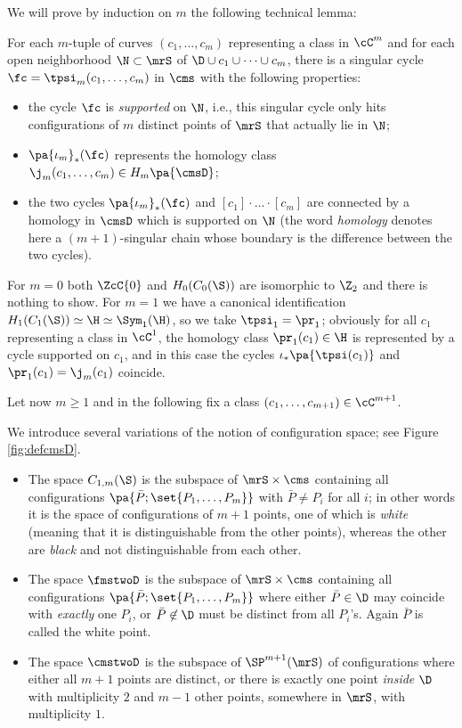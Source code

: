 We will prove by induction on $m$ the following technical lemma:

\begin{lem}
 \label{lem:tpsiwithproperties}
For each $m$-tuple of curves $(c_1,\dots,c_m)$ representing a class in $\cC^m$
and for each open neighborhood $\N\subset\mrS$ of
$\D\cup c_1\cup\dots\cup c_m$, there is a singular cycle $\fc=\tpsi_m(c_1,\dots,c_m)$
in $\cms$ with the following properties:
\begin{itemize}
 \item the cycle $\fc$ is \emph{supported} on $\N$, i.e.,
this singular cycle only hits configurations of $m$ distinct points of $\mrS$ that actually lie in $\N$;
\item $\pa{\iota_m}_*(\fc)$ represents the homology class $\j_m(c_1,\dots,c_m)\in H_m\pa{\cmsD}$;
\item the two cycles $\pa{\iota_m}_*(\fc)$ and $[c_1]\cdot\ldots\cdot[c_m]$
are connected by a homology in $\cmsD$ which is supported on $\N$ (the word
\emph{homology} denotes here a $(m+1)$-singular chain whose boundary is the difference between the two cycles).
\end{itemize}
\end{lem}

For $m=0$ both $\ZcC{0}$ and $H_0(C_0(\S))$ are
isomorphic to $\Z_2$ and there is nothing to show. For $m=1$
we have a canonical identification $H_1(C_1(\S))\simeq\H\simeq\Sym_1(\H)$, so we take $\tpsi_1=\pr_1$;
obviously for all $c_1$ representing a class in $\cC^1$, the homology class $\pr_1(c_1)\in\H$
is represented by a cycle supported on $c_1$,
and in this case the cycles $\iota_*\pa{\tpsi(c_1)}$ and $\pr_1(c_1)=\j_m(c_1)$ coincide.

Let now $m\geq 1$ and in the following fix a class $(c_1,\dots, c_{m+1})\in\cC^{m+1}$.

\begin{defn}
\label{defn:variationsCm}
We introduce several variations of the notion of configuration space; see Figure \ref{fig:defcmsD}.
\begin{itemize} 
 \item The space $C_{1,m}(\S)$ is the subspace of $\mrS\times \cms$ containing all configurations
 $\pa{\bar P;\set{P_1,\dots,P_m}}$ with $\bar P\neq P_i$ for all $i$; in other words it is
 the space of configurations of $m+1$ points, one of which is \emph{white} (meaning that
 it is distinguishable from the other points), whereas the other are \emph{black} and not distinguishable
 from each other.
 \item The space $\fmstwoD$ is the subspace of $\mrS\times\cms$ containing all configurations
 $\pa{\bar P;\set{P_1,\dots, P_m}}$ where either $\bar P\in\D$ may coincide with \emph{exactly}
 one $P_i$, or
 $\bar P\not\in \D$ must be distinct from all $P_i$'s.
 Again $\bar P$ is called the white point.
 \item The space $\cmstwoD$ is the subspace of $\SP^{m+1}(\mrS)$ of configurations where either all $m+1$ points
 are distinct, or there is exactly one point \emph{inside $\D$} with multiplicity $2$ and $m-1$ other points,
 somewhere in $\mrS$, with multiplicity $1$.
\end{itemize}
 \end{defn}
 
